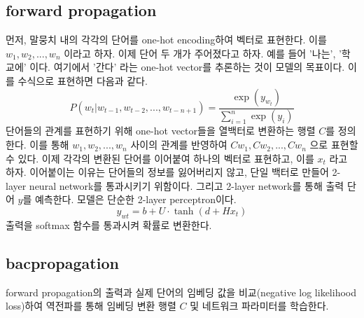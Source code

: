 \documentclass[
	11pt,
	a4paper,
	figtabcapt,
]{oblivoir}
\begin{document}
\subsection{forward propagation}
먼저, 말뭉치 내의 각각의 단어를 one-hot encoding하여 벡터로 표현한다. 이를 $w_1, w_2, ..., w_n$ 이라고 하자.
이제 단어 두 개가 주어졌다고 하자. 예를 들어 '나는', '학교에' 이다. 여기에서 '간다' 라는 one-hot vector를 추론하는 것이 모델의 목표이다.
이를 수식으로 표현하면 다음과 같다.
\begin{equation}
	 P(w_t | w_{t-1}, w_{t-2}, ..., w_{t - n + 1}) = \frac{\exp(y_{w_t})}{\sum_{i=1}^n \exp{(y_i)}}
\end{equation}
단어들의 관계를 표현하기 위해 one-hot vector들을 열백터로 변환하는 행렬 $C$를 정의한다.
이를 통해 $w_1, w_2, ..., w_n$ 사이의 관계를 반영하여 $Cw_1, Cw_2, ..., Cw_n$ 으로 표현할 수 있다.
이제 각각의 변환된 단어를 이어붙여 하나의 벡터로 표현하고, 이를 $x_t$ 라고 하자.
이어붙이는 이유는 단어들의 정보를 잃어버리지 않고, 단일 백터로 만들어 2-layer neural network를 통과시키기 위함이다.
그리고 2-layer network를 통해 출력 단어 $y$를 예측한다. 모델은 단순한 2-layer perceptron이다.
\begin{equation}
	y_{wt} = b + U \cdot \tanh(d + Hx_t)
\end{equation}
출력을 softmax 함수를 통과시켜 확률로 변환한다.

\subsection{bacpropagation}
forward propagation의 출력과 실제 단어의 임베딩 값을 비교(negative log likelihood loss)하여 역전파를 통해
임베딩 변환 행렬 $C$ 및 네트워크 파라미터를 학습한다.
\end{document}
